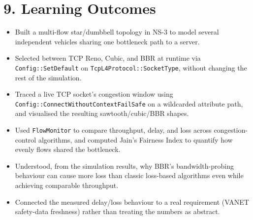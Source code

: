 \documentclass[11pt]{article}
\begin{document}
\section*{9. Learning Outcomes}
\begin{itemize}
  \item Built a multi-flow star/dumbbell topology in NS-3 to model several
        independent vehicles sharing one bottleneck path to a server.
  \item Selected between TCP Reno, Cubic, and BBR at runtime via
        \texttt{Config::SetDefault} on \texttt{TcpL4Protocol::SocketType},
        without changing the rest of the simulation.
  \item Traced a live TCP socket's congestion window using
        \texttt{Config::ConnectWithoutContextFailSafe} on a wildcarded
        attribute path, and visualised the resulting sawtooth/cubic/BBR
        shapes.
  \item Used \texttt{FlowMonitor} to compare throughput, delay, and loss
        across congestion-control algorithms, and computed Jain's Fairness
        Index to quantify how evenly flows shared the bottleneck.
  \item Understood, from the simulation results, why BBR's bandwidth-probing
        behaviour can cause more loss than classic loss-based algorithms even
        while achieving comparable throughput.
  \item Connected the measured delay/loss behaviour to a real requirement
        (VANET safety-data freshness) rather than treating the numbers as
        abstract.
\end{itemize}
\end{document}
